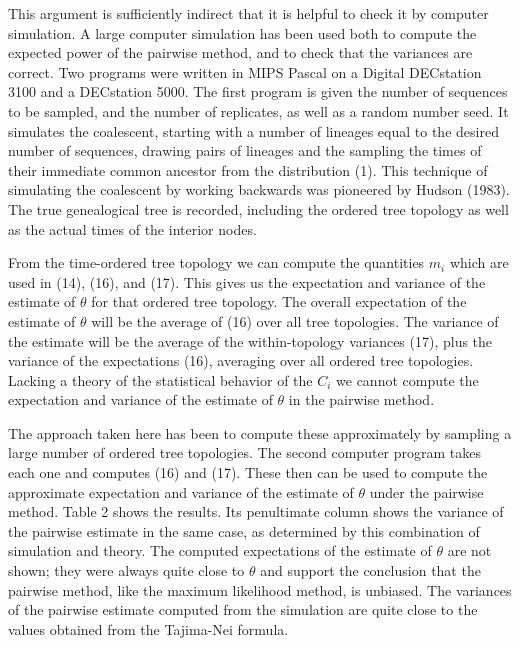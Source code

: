 This argument is sufficiently indirect that it is helpful to check it by
computer simulation.  A large computer simulation has been used both to
compute the expected power of the pairwise method, and to check that the
variances are
correct.  Two programs were written in MIPS Pascal on a Digital DECstation
3100 and a DECstation 5000.  The first program is given the number of
sequences to be
sampled, and the number of replicates, as well as a random number seed.
It simulates the coalescent, starting with a number of lineages equal to
the desired number of sequences, drawing pairs of lineages and the sampling
the times of their immediate common ancestor from the distribution (1).
This technique of simulating the coalescent by working backwards was
pioneered by Hudson (1983).  The true genealogical tree is recorded,
including the ordered tree topology as well as the actual times of the
interior nodes.  

From the time-ordered tree topology we can compute the quantities $m_i$
which are used in (14), (16), and (17).  This gives us the expectation
and variance of the estimate of $\theta$ for that ordered tree topology.
The overall expectation of the estimate of $\theta$ will be the average of
(16) over all tree topologies.  The variance of the estimate will be
the average of the within-topology variances (17), plus the variance of
the expectations (16), averaging over all ordered tree topologies.  Lacking
a theory of the statistical behavior of the $C_i$ we cannot compute the
expectation and variance of the estimate of $\theta$ in the pairwise method.

The approach taken here has been to compute these approximately by
sampling a large number of ordered tree topologies. The second computer
program takes each one and computes (16) and (17).  These then can be
used to compute the approximate expectation and variance of the estimate
of $\theta$ under the pairwise method.  Table 2 shows the results.  Its
penultimate column shows 
the variance of the pairwise estimate in the same case, as determined
by this combination of simulation and theory.  The computed expectations
of the estimate of $\theta$ are not shown; they were always quite close to
$\theta$ and support the conclusion that the pairwise method, like the maximum
likelihood method, is unbiased.  The variances of the pairwise estimate
computed from the simulation are quite close to the values obtained from
the Tajima-Nei formula.

